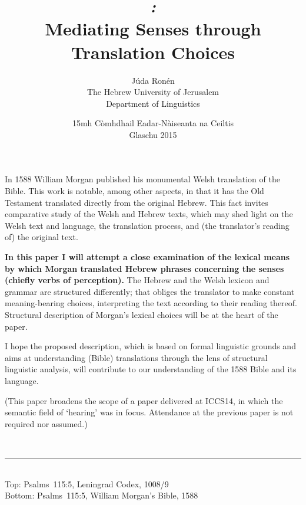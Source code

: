 
\title{\vspace{-1cm}
	{
		\Large
		\emph{:}\\
		Mediating Senses through Translation Choices
	}
}
\author{%
	\normalsize Júda Ronén\\[-0.1em]
	\small The Hebrew University of Jerusalem\\[-0.1em]
	\small Department of Linguistics
}
\date{
	\normalsize 15mh Còmhdhail Eadar-Nàiseanta na Ceiltis\\
	\normalsize Glaschu 2015
}
\maketitle
\thispagestyle{empty}


\vspace{-0.5cm}
{\small
\noindent
In 1588 William Morgan published his monumental Welsh translation of the Bible. This work is notable, among other aspects, in that it has the Old Testament translated directly from the original Hebrew. This fact invites comparative study of the Welsh and Hebrew texts, which may shed light on the Welsh text and language, the translation process, and (the translator’s reading of) the original text.

\textbf{In this paper I will attempt a close examination of the lexical means by which Morgan translated Hebrew phrases concerning the senses (chiefly verbs of perception).} The Hebrew and the Welsh lexicon and grammar are structured differently; that obliges the translator to make constant meaning-bearing choices, interpreting the text according to their reading thereof. Structural description of Morgan’s lexical choices will be at the heart of the paper.

I hope the proposed description, which is based on formal linguistic grounds and aims at understanding (Bible) translations through the lens of structural linguistic analysis, will contribute to our understanding of the 1588 Bible and its language.

(This paper broadens the scope of a paper delivered at ICCS14, in which the semantic field of ‘hearing’ was in focus. Attendance at the previous paper is not required nor assumed.)
}

~

\hrule

\vfill

\begin{center}
	\hfill
	\\
	Top: Psalms~115:5, Leningrad Codex, 1008/9\\
	Bottom: Psalms~115:5, William Morgan’s Bible, 1588
\end{center}

